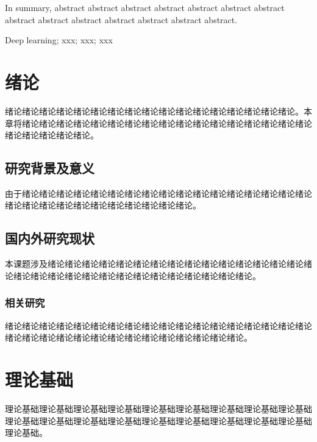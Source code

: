 \documentclass[UTF-8,a4paper,twoside]{article}
\numberwithin{equation}{section} %
\numberwithin{table}{section} %
\numberwithin{figure}{section} %
\begin{document}
In summary, abstract abstract abstract abstract abstract abstract abstract abstract abstract abstract abstract abstract abstract abstract.

\noindent{}Deep learning; xxx; xxx; xxx

\newpage
\thispagestyle{pre}
\begin{center}
	\tableofcontents
\end{center}
\thispagestyle{pre}

\newpage
\pagestyle{main}
\setcounter{page}{1}
\section{绪论}
绪论绪论绪论绪论绪论绪论绪论绪论绪论绪论绪论绪论绪论绪论绪论绪论绪论。本章将绪论绪论绪论绪论绪论绪论绪论绪论绪论绪论绪论绪论绪论绪论绪论绪论绪论绪论绪论绪论绪论绪论。

\subsection{研究背景及意义}
由于绪论\cite{wang2020cspnet}绪论绪论绪论绪论绪论绪论绪论绪论绪论绪论\cite{公安联网标准}绪论绪论绪论绪论绪论绪论绪论绪论绪论绪论绪论绪论绪论绪论绪论绪论绪论。

\subsection{国内外研究现状}
本课题涉及绪论绪论绪论\cite{廖云飞}绪论绪论绪论绪论绪论绪论绪论绪论绪论\cite{渣土车未苫盖检测}绪论绪论绪论绪论绪论绪论绪论绪论绪论绪论绪论绪论绪论绪论绪论绪论绪论绪论。

\subsubsection{相关研究}
绪论绪论绪论绪论绪论绪论绪论绪论\cite{duchi2011adaptive}绪论绪论绪论绪论绪论绪论绪论绪论绪论绪论绪论\cite{kingma2014adam}绪论绪论绪论绪论绪论绪论绪论绪论绪论绪论绪论绪论绪论。

\newpage
\section{理论基础}
理论基础理论基础理论基础理论基础理论基础理\cite{lee2021mlcourse}论基础理论基础理论基础理论基础理论基础理论基础理论基础理论基础理论基础理论基础理论基础理论基础理论基础理论基础。
\end{document}
